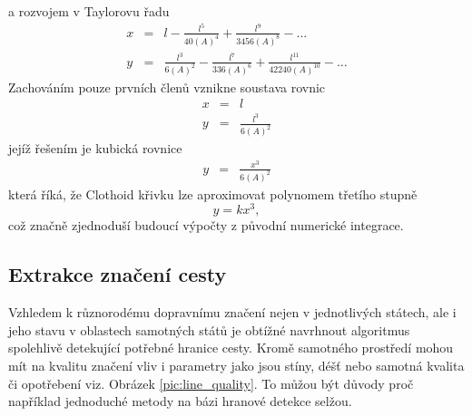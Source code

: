 \documentclass[czech, bc, kky, he, iso690alph]{fasthesis}
\begin{document}
                a rozvojem v Taylorovu řadu
                    \begin{eqnarray}
                        x & = & l -\frac{l^{5}}{40(A)^{4}}+\frac{l^{9}}{3456(A)^{8}}-\dots\\
                        y & = & \frac{l^{3}}{6(A)^{2}}-\frac{l^{7}}{336(A)^{6}}+\frac{l^{11}}{42240(A)^{10}}-\dots
                    \end{eqnarray}
                Zachováním pouze prvních členů vznikne soustava rovnic
                    \begin{eqnarray}
                        x & = & l \\
                        y & = & \frac{l^{3}}{6(A)^{2}}
                    \end{eqnarray}
                jejíž řešením je kubická rovnice
                    \begin{eqnarray}
                        y & = & \frac{x^{3}}{6(A)^{2}}
                        \label{eqn:dukaz_aproximace_clothoidu_polynomem_3st}
                    \end{eqnarray}
                která říká, že Clothoid křivku lze aproximovat polynomem třetího stupně
                    \begin{equation}
                        y = k x^{3},
                    \end{equation}
                což značně zjednoduší budoucí výpočty z původní numerické integrace.
                
            \subsection{Extrakce značení cesty}
                Vzhledem k různorodému dopravnímu značení nejen v jednotlivých státech, ale i jeho stavu v oblastech samotných států je obtížné navrhnout algoritmus spolehlivě detekující potřebné hranice cesty. Kromě samotného prostředí mohou mít na kvalitu značení vliv i parametry jako jsou stíny, déšť nebo samotná kvalita či opotřebení viz. Obrázek \ref{pic:line_quality}. To můžou být důvody proč například jednoduché metody na bázi hranové detekce selžou. 
                
\end{document}
